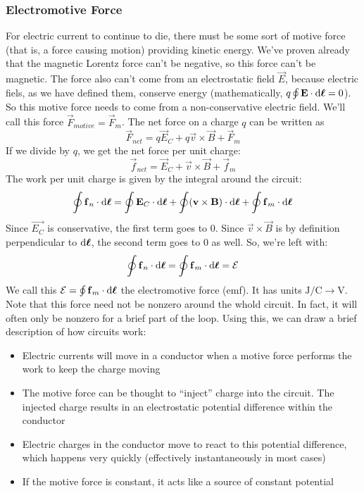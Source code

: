 \documentclass[a4paper]{article}
\begin{document}
\subsubsection{Electromotive Force}
For electric current to continue to die, there must be some sort of motive
force (that is, a force causing motion) providing kinetic energy. We've
proven already that the magnetic Lorentz force can't be negative, so this
force can't be magnetic. The force also can't come from an electrostatic field
$\vec{E}$, because electric fiels, as we have defined them, conserve energy
(mathematically, $q\oint\boldsymbol{\mathbf{E}}\cdot\mathrm{d}\boldsymbol{\mathbf{\ell}}=0$). So this motive force
needs to come from a non-conservative electric field. We'll call this force
$\vec{F}_{motive} = \vec{F}_m$. The net force on a charge $q$ can be written as
\[ \vec{F}_{net} = q\vec{E}_C + q\vec{v}\times\vec{B} + \vec{F}_m \]
If we divide by $q$, we get the net force per unit charge:
\[ \vec{f}_{net} =
	\vec{E}_C + \vec{v}\times\vec{B} + \vec{f}_m \]
The work per unit charge is given by the integral around the circuit:
\[
	\oint \boldsymbol{\mathbf{f}}_n\cdot\mathrm{d}\boldsymbol{\mathbf{\ell}} = 
	\oint \boldsymbol{\mathbf{E}}_C \cdot \mathrm{d}\boldsymbol{\mathbf{\ell}} +
	\oint (\boldsymbol{\mathbf{v}} \times \boldsymbol{\mathbf{B}}) \cdot \mathrm{d}\boldsymbol{\mathbf{\ell}} +
	\oint \boldsymbol{\mathbf{f}}_m \cdot \mathrm{d}\boldsymbol{\mathbf{\ell}}
\]
Since $\vec{E_C}$ is conservative, the first term goes to 0. Since
$\vec{v}\times\vec{B}$ is by definition perpendicular to $\mathrm{d}\boldsymbol{\mathbf{\ell}}$, the
second term goes to 0 as well. So, we're left with:
\[
	\oint \boldsymbol{\mathbf{f}}_n \cdot \mathrm{d}\boldsymbol{\mathbf{\ell}} =
	\oint \boldsymbol{\mathbf{f}}_m \cdot \mathrm{d}\boldsymbol{\mathbf{\ell}} =
	\mathcal{E}
\]
We call this $\mathcal{E} = \oint \boldsymbol{\mathbf{f}}_m \cdot \mathrm{d}\boldsymbol{\mathbf{\ell}}$ the electromotive force
(emf). It has units $\mathrm{J/C} \to \mathrm{V}$. Note that this force
need not be nonzero around the whold circuit. In fact, it will often only
be nonzero for a brief part of the loop. Using this, we can draw a brief
description of how circuits work:
\begin{itemize}
	\item Electric currents will move in a conductor when a motive force
		performs the work to keep the charge moving
	\item The motive force can be thought to ``inject'' charge into the
		circuit. The injected charge results in an electrostatic
		potential difference within the conductor
	\item Electric charges in the conductor move to react to this
		potential difference, which happens very quickly (effectively
		instantaneously in most cases)
	\item If the motive force is constant, it acts like a source of
		constant potential
\end{itemize}
\end{document}
